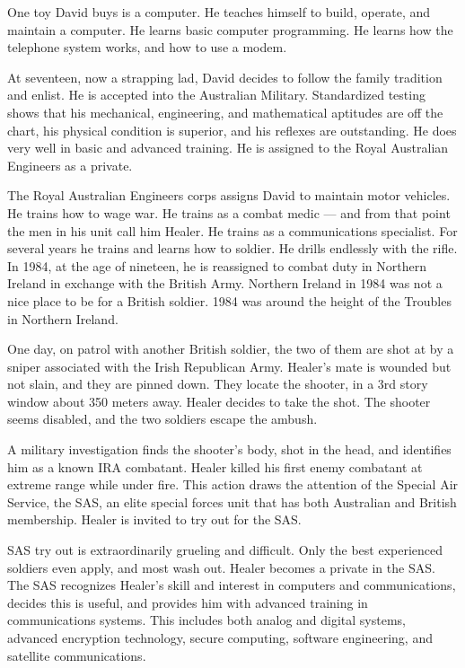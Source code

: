 One toy David buys is a computer.  He teaches himself to build, operate, and maintain a computer.  He learns basic computer programming.  He learns how the telephone system works, and how to use a modem.

At seventeen, now a strapping lad, David decides to follow the family tradition and enlist.  He is accepted into the Australian Military.  Standardized testing shows that his mechanical, engineering, and mathematical aptitudes are off the chart, his physical condition is superior, and his reflexes are outstanding.  He does very well in basic and advanced training.  He is assigned to the Royal Australian Engineers as a private.

The Royal Australian Engineers corps assigns David to maintain motor vehicles.   He trains how to wage war.  He trains as a combat medic --- and from that point the men in his unit call him Healer.  He trains as a communications specialist.  For several years he trains and learns how to soldier.  He drills endlessly with the rifle.  In 1984, at the age of nineteen, he is reassigned to combat duty in Northern Ireland in exchange with the British Army.  Northern Ireland in 1984 was not a nice place to be for a British soldier.  1984 was around the height of the Troubles in Northern Ireland.

One day, on patrol with another British soldier, the two of them are shot at by a sniper associated with the Irish Republican Army.  Healer's mate is wounded but not slain, and they are pinned down.  They locate the shooter, in a 3rd story window about 350 meters away.  Healer decides to take the shot.  The shooter seems disabled, and the two soldiers escape the ambush.

A military investigation finds the shooter's body, shot in the head, and identifies him as a known IRA combatant.  Healer killed his first enemy combatant at extreme range while under fire.  This action draws the attention of the Special Air Service, the SAS, an elite special forces unit that has both Australian and British membership.  Healer is invited to try out for the SAS.

SAS try out is extraordinarily grueling and difficult.  Only the best experienced soldiers even apply, and most wash out.  Healer becomes a private in the SAS.   The SAS recognizes Healer's skill and interest in computers and communications, decides this is useful, and provides him with advanced training in communications systems.  This includes both analog and digital systems, advanced encryption technology, secure computing, software engineering, and satellite communications.

